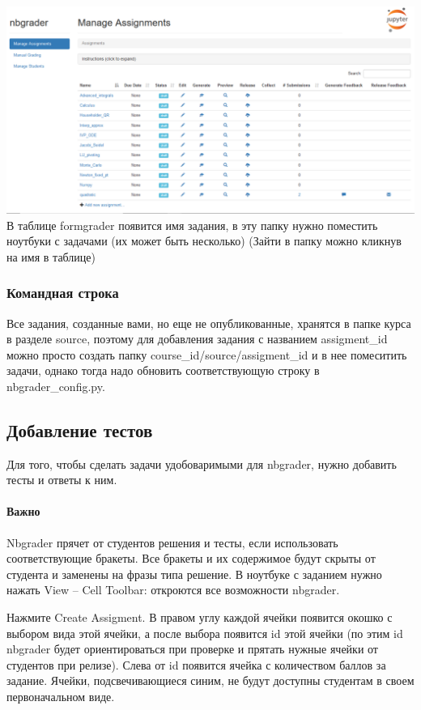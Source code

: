 \documentclass[a4paper,12pt]{article}
\begin{document}
\includegraphics[width=\textwidth]{formgrader_tab2}
В таблице formgrader появится имя задания, в эту папку нужно поместить ноутбуки с задачами (их может быть несколько)
(Зайти в папку можно кликнув на имя в таблице)
\subsubsection{Командная строка}

Все задания, созданные вами, но еще не опубликованные, хранятся в папке курса в разделе source, поэтому для добавления задания с названием assigment\_id можно просто создать папку course\_id/source/assigment\_id и в нее помеситить задачи, однако тогда надо обновить соответствующую строку в nbgrader\_config.py.
\subsection{Добавление тестов}

Для того, чтобы сделать задачи удобоваримыми для nbgrader, нужно добавить тесты и ответы к ним.
\paragraph{Важно}Nbgrader прячет от студентов решения и тесты, если использовать соответствующие бракеты. Все бракеты и их содержимое будут скрыты от студента и заменены на фразы типа   решение\grqq.
В ноутбуке с заданием нужно нажать View -- Cell Toolbar: откроются все возможности nbgrader.

Нажмите Create Assigment. В правом углу каждой ячейки появится окошко с выбором вида этой ячейки, а после выбора появится id этой ячейки (по этим id nbgrader будет ориентироваться при проверке и прятать нужные ячейки от студентов при релизе). Слева от id появится ячейка с количеством баллов за задание. Ячейки, подсвечивающиеся синим, не будут доступны студентам в своем первоначальном виде.
\end{document}

